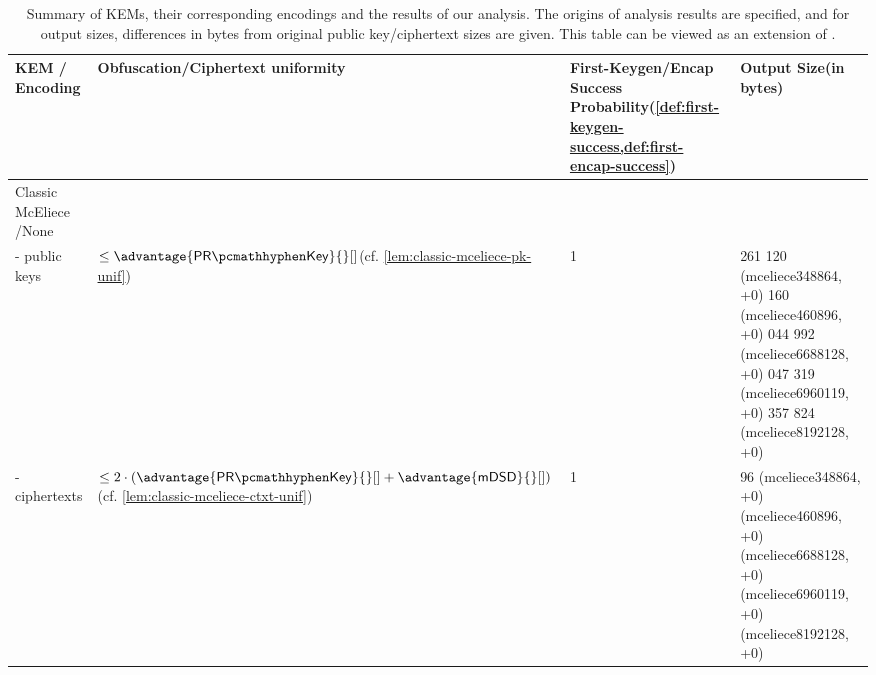 \begin{table}
    \centering
    \tiny\raggedright
    \begin{tabular}{@{} L{0.2\textwidth-\tabcolsep} | L{0.35\tabcolsep} L{0.2\tabcolsep} L{0.25\textwidth-\tabcolsep} @{}}
        \textbf{KEM /\newline Encoding} & \textbf{Obfuscation/Ciphertext uniformity} & \textbf{First-Keygen/Encap Success Probability}\newline (\cref{def:first-keygen-success,def:first-encap-success}) & \textbf{Output Size}\newline (in bytes)\\ \hline
        Classic McEliece \cite{NISTPQC-R4:ClassicMcEliece22} /\newline None & \rule{0pt}{1.2em} &  & \\
        - public keys & $\leq \advantage{\prkey}{}[]$\newline (cf. \cref{lem:classic-mceliece-pk-unif})
         & 1
         & 261 120 (\textsf{mceliece348864}, +0) 160 (\textsf{mceliece460896}, +0) 044 992 (\textsf{mceliece6688128}, +0) 047 319 (\textsf{mceliece6960119}, +0) 357 824 (\textsf{mceliece8192128}, +0)\newline \\
        - ciphertexts & $\leq 2 \cdot \left( \advantage{\prkey}{}[] + \advantage{\mdsd}{}[] \right)$\newline (cf. \cref{lem:classic-mceliece-ctxt-unif})
         & 1
         & 96 (\textsf{mceliece348864}, +0) (\textsf{mceliece460896}, +0) (\textsf{mceliece6688128}, +0) (\textsf{mceliece6960119}, +0) (\textsf{mceliece8192128}, +0)\newline \\
    \end{tabular}
    \caption{Summary of KEMs, their corresponding encodings and the results of our analysis. The origins of analysis results are specified, and for output sizes, differences in bytes from original public key/ciphertext sizes are given. This table can be viewed as an extension of \cite[Table~2]{CCS:GunSteVei24}.}
    \label{tab:obfuscation-summary}
\end{table}
